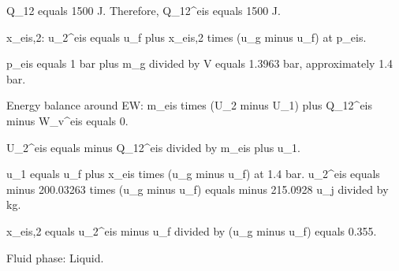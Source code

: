 Q_12 equals 1500 J. Therefore, Q_12^eis equals 1500 J.  

x_eis,2:  
u_2^eis equals u_f plus x_eis,2 times (u_g minus u_f) at p_eis.  

p_eis equals 1 bar plus m_g divided by V equals 1.3963 bar, approximately 1.4 bar.  

Energy balance around EW:  
m_eis times (U_2 minus U_1) plus Q_12^eis minus W_v^eis equals 0.  

U_2^eis equals minus Q_12^eis divided by m_eis plus u_1.  

u_1 equals u_f plus x_eis times (u_g minus u_f) at 1.4 bar.  
u_2^eis equals minus 200.03263 times (u_g minus u_f) equals minus 215.0928 u_j divided by kg.  

x_eis,2 equals u_2^eis minus u_f divided by (u_g minus u_f) equals 0.355.  

Fluid phase: Liquid.